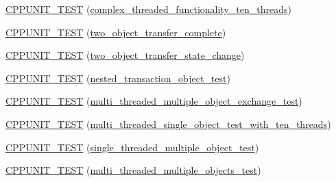 \begin{DoxyCompactItemize}
\item 
\hyperlink{class_my_test_c_ase_a584ea0c3da69c7533b9bf6d30c747f5c_a584ea0c3da69c7533b9bf6d30c747f5c}{C\+P\+P\+U\+N\+I\+T\+\_\+\+T\+E\+ST} (\hyperlink{class_my_test_c_ase_ad91f8c37cd32055b834c84f10edeb979_ad91f8c37cd32055b834c84f10edeb979}{complex\+\_\+threaded\+\_\+functionality\+\_\+ten\+\_\+threads})
\item 
\hyperlink{class_my_test_c_ase_a3f3a97080a6553264e15c414c70faa44_a3f3a97080a6553264e15c414c70faa44}{C\+P\+P\+U\+N\+I\+T\+\_\+\+T\+E\+ST} (\hyperlink{class_my_test_c_ase_a6399ca8bca3f10a0f114a070d3e3a570_a6399ca8bca3f10a0f114a070d3e3a570}{two\+\_\+object\+\_\+transfer\+\_\+complete})
\item 
\hyperlink{class_my_test_c_ase_a74ba217b63d4a21ff11575b136bc5c67_a74ba217b63d4a21ff11575b136bc5c67}{C\+P\+P\+U\+N\+I\+T\+\_\+\+T\+E\+ST} (\hyperlink{class_my_test_c_ase_ab9c76eb2dfd565a353ae9a5f604b36d9_ab9c76eb2dfd565a353ae9a5f604b36d9}{two\+\_\+object\+\_\+transfer\+\_\+state\+\_\+change})
\item 
\hyperlink{class_my_test_c_ase_a7f076df702b7b2b857b662140cf8b93d_a7f076df702b7b2b857b662140cf8b93d}{C\+P\+P\+U\+N\+I\+T\+\_\+\+T\+E\+ST} (\hyperlink{class_my_test_c_ase_ad5d3718a6ed5ef68ad711456d6defd62_ad5d3718a6ed5ef68ad711456d6defd62}{nested\+\_\+transaction\+\_\+object\+\_\+test})
\item 
\hyperlink{class_my_test_c_ase_a0e32aa7667d827d00324260a5f7d977b_a0e32aa7667d827d00324260a5f7d977b}{C\+P\+P\+U\+N\+I\+T\+\_\+\+T\+E\+ST} (\hyperlink{class_my_test_c_ase_a41c93b64fb95fa83809b6457b608e2da_a41c93b64fb95fa83809b6457b608e2da}{multi\+\_\+threaded\+\_\+multiple\+\_\+object\+\_\+exchange\+\_\+test})
\item 
\hyperlink{class_my_test_c_ase_a94e17267727e26bc7eafcff1c21daf02_a94e17267727e26bc7eafcff1c21daf02}{C\+P\+P\+U\+N\+I\+T\+\_\+\+T\+E\+ST} (\hyperlink{class_my_test_c_ase_afea0c5983bf1fcc38d8962cfa6277da4_afea0c5983bf1fcc38d8962cfa6277da4}{multi\+\_\+threaded\+\_\+single\+\_\+object\+\_\+test\+\_\+with\+\_\+ten\+\_\+threads})
\item 
\hyperlink{class_my_test_c_ase_a20a2a3fb557870c30b7d61aa99a5da7b_a20a2a3fb557870c30b7d61aa99a5da7b}{C\+P\+P\+U\+N\+I\+T\+\_\+\+T\+E\+ST} (\hyperlink{class_my_test_c_ase_a2f75b781b07bdbc3649c10d6845cb3cc_a2f75b781b07bdbc3649c10d6845cb3cc}{single\+\_\+threaded\+\_\+multiple\+\_\+object\+\_\+test})
\item 
\hyperlink{class_my_test_c_ase_a2ecaeaada1bd14eab53bdd4d35d64b31_a2ecaeaada1bd14eab53bdd4d35d64b31}{C\+P\+P\+U\+N\+I\+T\+\_\+\+T\+E\+ST} (\hyperlink{class_my_test_c_ase_ae49b83ddf0fa297dbb8639001644fa5c_ae49b83ddf0fa297dbb8639001644fa5c}{multi\+\_\+threaded\+\_\+multiple\+\_\+objects\+\_\+test})

\end{DoxyCompactItemize}

